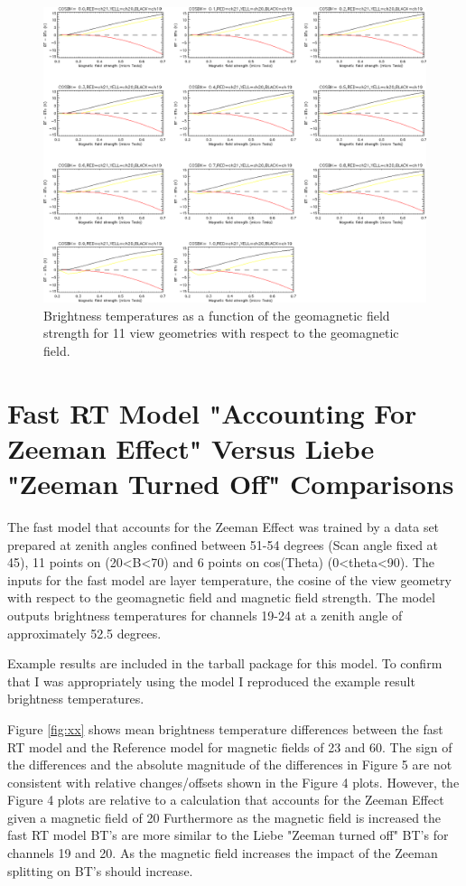 \begin{figure}[htp]
  \centering{}
  \includegraphics[scale=0.8]{./graphics/Figure4.eps}
  \caption{Brightness temperatures as a function of the geomagnetic field strength for 11 view geometries with
   respect to the geomagnetic field.}
\end{figure}

\section{Fast RT Model "Accounting For Zeeman Effect" Versus Liebe "Zeeman Turned Off" Comparisons}
The fast model that accounts for the Zeeman Effect was trained by a data set prepared
at zenith angles confined between 51-54 degrees (Scan angle fixed at 45), 11 points on (20<B<70)
and 6 points on cos(Theta) (0<theta<90). The inputs for the fast model are layer temperature, the cosine
of the view geometry with respect to the geomagnetic field and magnetic field strength. The model outputs 
brightness temperatures for channels 19-24 at a zenith angle of approximately 52.5 degrees. 

Example results are included in the tarball package for this model. 
To confirm that I was appropriately using the model I reproduced 
the example result brightness temperatures.

Figure \ref{fig:xx} shows mean brightness temperature differences between the fast RT model and the Reference model for 
magnetic fields of 23\microtesla{} and 60\microtesla{}. The sign of the differences and the absolute magnitude
of the differences in Figure 5 are not consistent with relative changes/offsets shown in the Figure 4 plots. However,
the Figure 4 plots are relative to a calculation that accounts for the Zeeman Effect given a magnetic field of 20\microtesla{}
Furthermore as the magnetic field is increased the fast RT model BT's are more similar to the Liebe "Zeeman turned
off" BT's for channels 19 and 20. As the magnetic field increases the impact of the Zeeman splitting on BT's should
increase. 
   
